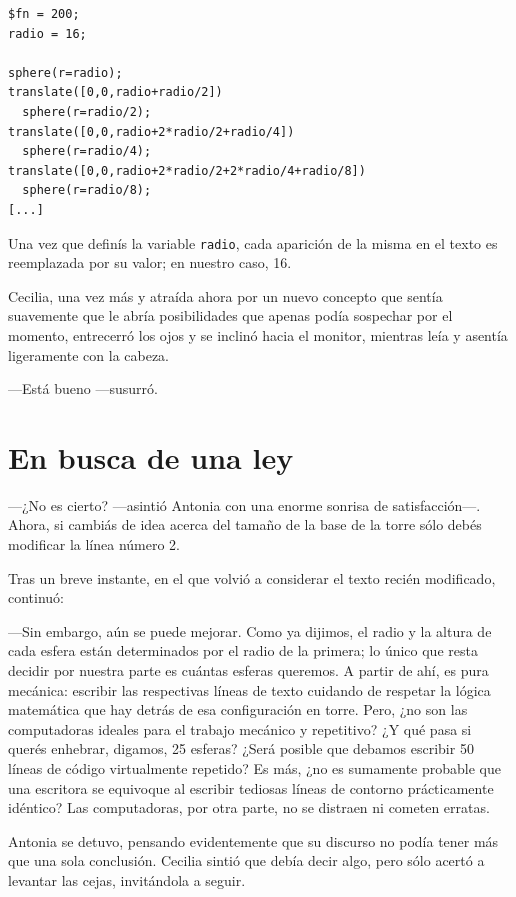 \begin{lstlisting}
$fn = 200;
radio = 16;

sphere(r=radio);
translate([0,0,radio+radio/2])
  sphere(r=radio/2);
translate([0,0,radio+2*radio/2+radio/4])
  sphere(r=radio/4);
translate([0,0,radio+2*radio/2+2*radio/4+radio/8])
  sphere(r=radio/8);
[...]
\end{lstlisting}%

\guillemotright Una vez que definís la variable \texttt{radio}, cada
aparición de la misma en el texto es reemplazada por su valor; en
nuestro caso, 16.
 
Cecilia, una vez más y atraída ahora por un nuevo concepto que sentía
suavemente que le abría posibilidades que apenas podía sospechar por
el momento, entrecerró los ojos y se inclinó hacia el monitor, mientras
leía y asentía ligeramente con la cabeza.

---Está bueno ---susurró.

\section{En busca de una ley}

---¿No es cierto? ---asintió Antonia con una enorme sonrisa de
satisfacción---. Ahora, si cambiás de idea acerca del tamaño de la
base de la torre sólo debés modificar la línea número 2.

Tras un breve instante, en el que volvió a considerar el texto recién
modificado, continuó:

---Sin embargo, aún se puede mejorar. Como ya dijimos, el radio y la
altura de cada esfera están determinados por el radio de la primera;
lo único que resta decidir por nuestra parte es cuántas esferas
queremos. A partir de ahí, es pura mecánica: escribir las respectivas
líneas de texto cuidando de respetar la lógica matemática que hay
detrás de esa configuración en torre. Pero, ¿no son las computadoras
ideales para el trabajo mecánico y repetitivo? ¿Y qué pasa si querés
enhebrar, digamos, 25 esferas? ¿Será posible que debamos escribir 50
líneas de código virtualmente repetido? Es más, ¿no es sumamente
probable que una escritora se equivoque al escribir tediosas líneas de
contorno prácticamente idéntico?  Las computadoras, por otra parte, no
se distraen ni cometen erratas.

Antonia se detuvo, pensando evidentemente que su discurso no podía
tener más que una sola conclusión. Cecilia sintió que debía decir
algo, pero sólo acertó a levantar las cejas, invitándola a seguir.

